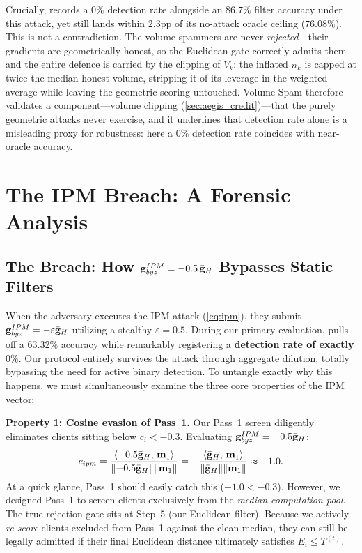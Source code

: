 \documentclass[../main.tex]{subfiles}
\begin{document}
Crucially, \aegis{} records a $0\%$ detection rate alongside an $86.7\%$ filter accuracy under this attack, yet still lands within $2.3$pp of its no-attack oracle ceiling ($76.08\%$). This is not a contradiction. The volume spammers are never \emph{rejected}---their gradients are geometrically honest, so the Euclidean gate correctly admits them---and the entire defence is carried by the clipping of $\widetilde{V}_k$: the inflated $n_k$ is capped at twice the median honest volume, stripping it of its leverage in the weighted average while leaving the geometric scoring untouched. Volume Spam therefore validates a component---volume clipping (\cref{sec:aegis_credit})---that the purely geometric attacks never exercise, and it underlines that detection rate alone is a misleading proxy for robustness: here a $0\%$ detection rate coincides with near-oracle accuracy.

\section{The IPM Breach: A Forensic Analysis}
\label{sec:results_ipm}

\subsection{The Breach: How \texorpdfstring{$\mathbf{g}_{byz}^{IPM} = -0.5\,\bar{\mathbf{g}}_{H}$}{g\_byz\^IPM = -0.5 g\_H} Bypasses Static Filters}
\label{sec:results_ipm_breach}

When the adversary executes the IPM attack (\cref{eq:ipm}), they submit $\mathbf{g}_{byz}^{IPM} = -\varepsilon\bar{\mathbf{g}}_{H}$ utilizing a stealthy $\varepsilon = 0.5$. During our primary evaluation, \aegis{} pulls off a $63.32\%$ accuracy while remarkably registering a \textbf{detection rate of exactly $0\%$}. Our protocol entirely survives the attack through aggregate dilution, totally bypassing the need for active binary detection. To untangle exactly why this happens, we must simultaneously examine the three core properties of the IPM vector:

\textbf{Property 1: Cosine evasion of Pass~1.}
Our Pass~1 screen diligently eliminates clients sitting below $c_i < -0.3$. Evaluating $\mathbf{g}_{byz}^{IPM} = -0.5\bar{\mathbf{g}}_{H}$:
\begin{equation}
    c_{ipm} = \frac{\left\langle -0.5\bar{\mathbf{g}}_{H},\, \mathbf{m}_{1} \right\rangle}{\|{-0.5\bar{\mathbf{g}}_{H}}\|\|\mathbf{m}_{1}\|} = -\frac{\left\langle \bar{\mathbf{g}}_{H},\, \mathbf{m}_{1} \right\rangle}{\|\bar{\mathbf{g}}_{H}\|\|\mathbf{m}_{1}\|} \approx -1.0.
    \label{eq:ipm_pass1_cosine}
\end{equation}
At a quick glance, Pass~1 should easily catch this ($-1.0 < -0.3$). However, we designed Pass~1 to screen clients exclusively from the \emph{median computation pool}. The true rejection gate sits at Step~5 (our Euclidean filter). Because we actively \emph{re-score} clients excluded from Pass~1 against the clean median, they can still be legally admitted if their final Euclidean distance ultimately satisfies $E_i \leq T^{(t)}$.
\end{document}
